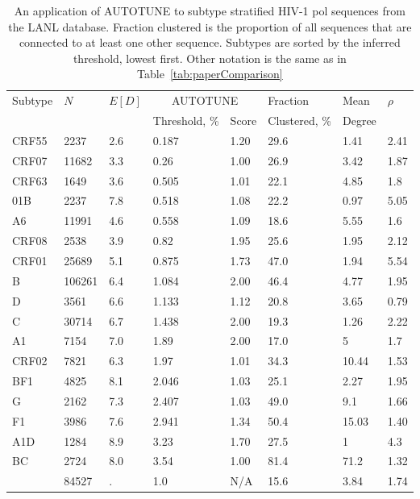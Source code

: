 \documentclass[utf8]{FrontiersinHarvard} %
\begin{document}
\begin{table}[h]
	\caption{An application of AUTOTUNE to subtype stratified HIV-1 pol sequences from the LANL database. Fraction clustered is the proportion of all sequences that are connected to at least one other sequence. Subtypes are sorted by the inferred threshold, lowest first. Other notation is the same as in Table~\ref{tab:paperComparison}}
	
	\vspace{10pt}
	\centering
	\begin{small}
	\label{tab:paperLANL}
	\begin{tabular}{llllllll}
	   \hline
		Subtype  &  $N$ & $E[D]$ & \multicolumn{2}{c}{AUTOTUNE} & Fraction & Mean &  $\rho$ \\
		     &  & & Threshold, \% & Score & Clustered, \% & Degree & \\
		    \hline
		     
		 CRF55 & 2237 & 2.6 & 0.187 & 1.20 & 29.6 & 1.41 & 2.41 \\
		 CRF07 & 11682 &  3.3 & 0.26 & 1.00& 26.9 & 3.42 & 1.87 \\
		 CRF63 & 1649 & 3.6 & 0.505 & 1.01 & 22.1 & 4.85 &  1.8 \\
		 01B	 & 2237 & 7.8 & 0.518 & 1.08 & 22.2 & 0.97 & 5.05 \\
		 A6 & 11991 & 4.6 & 0.558 &  1.09 & 18.6 & 5.55 & 1.6 \\
		CRF08 & 2538 &  3.9 & 0.82 & 1.95& 25.6 & 1.95 & 2.12 \\
		 CRF01 & 25689 & 5.1 & 0.875 & 1.73 & 47.0 & 1.94 & 5.54 \\
	 	B & 106261 & 6.4 & 1.084 & 2.00 & 46.4 & 4.77 & 1.95 \\
		 D & 3561 & 6.6 & 1.133 & 1.12 & 20.8 & 3.65 & 0.79 \\
		 C & 30714 & 6.7 & 1.438 & 2.00 & 19.3 & 1.26 & 2.22 \\
		 A1 & 7154 & 7.0 & 1.89 & 2.00 & 17.0 & 5 & 1.7 \\
		 CRF02 & 7821 &  6.3 & 1.97 & 1.01 & 34.3 & 10.44 & 1.53 \\
		 BF1 & 4825 & 8.1 & 2.046 & 1.03 & 25.1 & 2.27 & 1.95 \\
		 G & 2162 & 7.3 & 2.407 & 1.03 & 49.0 & 9.1 & 1.66\\
		 F1 & 3986 & 7.6 & 2.941 & 1.34 & 50.4 & 15.03 & 1.40 \\
		 A1D & 1284 & 8.9 & 3.23 & 1.70 & 27.5 & 1 & 4.3 \\
		 BC & 2724 & 8.0 & 3.54 & 1.00 & 81.4 & 71.2 & 1.32 \\ 
		 \hline
		 \citet{Wertheim:2014aa}  & 84527 & . & 1.0 & N/A & 15.6 & 3.84 & 1.74 \\
 		\hline
		
		\hline
	\end{tabular}
	\end{small}
\end{table}
\end{document}
